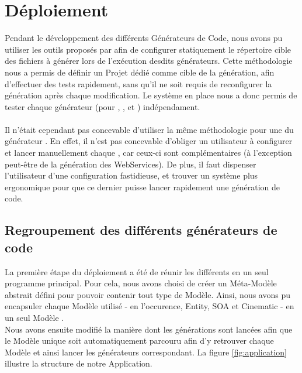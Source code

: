 \section{Déploiement}

Pendant le développement des différents Générateurs de Code, nous avons pu utiliser les outils proposés par \kweclipse{} afin de configurer statiquement le répertoire cible des fichiers à générer lors de l'exécution desdits générateurs. Cette méthodologie nous a permis de définir un Projet \kwplay{} dédié comme cible de la génération, afin d'effectuer des tests rapidement, sans qu'il ne soit requis de reconfigurer la génération après chaque modification. Le système en place nous a donc permis de tester chaque générateur (pour \kwentity, \kwsoa, et \kwcinematic) indépendament.
\\\\
Il n'était cependant pas concevable d'utiliser la même méthodologie pour une  du générateur \kwplay{}. En effet, il n'est pas concevable d'obliger un utilisateur à configurer et lancer manuellement chaque , car ceux-ci sont complémentaires (à l'exception peut-être de la génération des WebServices). De plus, il faut dispenser l'utilisateur d'une configuration fastidieuse, et trouver un système plus ergonomique pour que ce dernier puisse lancer rapidement une génération de code.

\subsection{Regroupement des différents générateurs de code}

La première étape du déploiement a été de réunir les différents  en un seul programme principal. Pour cela, nous avons choisi de créer un Méta-Modèle abstrait défini pour pouvoir contenir tout type de Modèle. Ainsi, nous avons pu encapsuler chaque Modèle utilisé - en l'occurence, Entity, SOA et Cinematic - en un seul Modèle .
\\
Nous avons ensuite modifié la manière dont les générations sont lancées afin que le Modèle unique soit automatiquement parcouru afin d'y retrouver chaque Modèle et ainsi lancer les générateurs correspondant. La figure \ref{fig:application} illustre la structure de notre Application.


